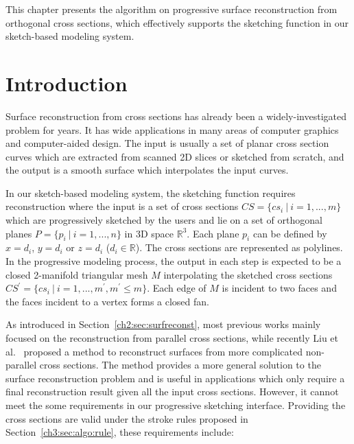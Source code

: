 This chapter presents the algorithm on progressive surface
reconstruction from orthogonal cross sections, which effectively
supports the sketching function in our sketch-based modeling system.

\section{Introduction}
\label{ch4:sec:intro}

Surface reconstruction from cross sections has already been a
widely-investigated problem for years. It has wide applications in
many areas of computer graphics and computer-aided design. The input
is usually a set of planar cross section curves which are extracted
from scanned 2D slices or sketched from scratch, and the output is a
smooth surface which interpolates the input curves.

In our sketch-based modeling system, the sketching function
requires reconstruction where the input is a set of cross sections
$CS=\{cs_i~|~i=1,...,m\}$ which are progressively sketched by the
users and lie on a set of orthogonal planes $P=\{p_i~|~i=1,...,n\}$
in 3D space $\mathbb{R}^3$. Each plane $p_i$ can be defined by
$x=d_i$, $y=d_i$ or $z=d_i$ ($d_i\in \mathbb{R}$). The cross
sections are represented as polylines. In the progressive modeling
process, the output in each step is expected to be a closed
2-manifold triangular mesh $M$ interpolating the sketched cross
sections $CS^\prime=\{cs_i~|~i=1,...,m^\prime, m^\prime\leq m\}$.
Each edge of $M$ is incident to two faces and the faces incident to
a vertex forms a closed fan.

As introduced in Section~\ref{ch2:sec:surfreconst}, most previous
works mainly focused on the reconstruction from parallel cross
sections, while recently Liu et al.~\cite{LBDLJ08} proposed a method
to reconstruct surfaces from more complicated non-parallel cross
sections. The method provides a more general solution to the surface
reconstruction problem and is useful in applications which only
require a final reconstruction result given all the input cross
sections. However, it cannot meet the some requirements in our
progressive sketching interface. Providing the cross sections are
valid under the stroke rules proposed in
Section~\ref{ch3:sec:algo:rule}, these requirements include:

